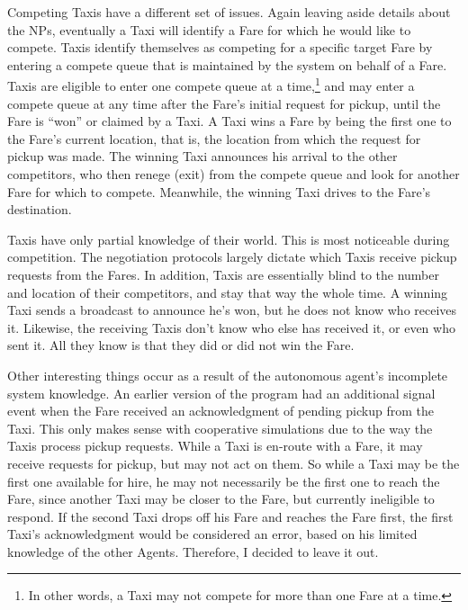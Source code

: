 \documentclass[11pt,letterpaper,onecolumn,twoside,openright,final]{report}
\begin{document}
Competing Taxis have a different set of issues.
Again leaving aside details about the NPs, eventually a Taxi will identify a Fare for which he would like to compete.
Taxis identify themselves as competing for a specific target Fare by entering a compete queue that is maintained by the system on behalf of a Fare.
Taxis are eligible to enter one compete queue at a time,\footnote{In other words, a Taxi may not compete for more than one Fare at a time.} and may enter a compete queue at any time after the Fare's initial request for pickup, until the Fare is ``won'' or claimed by a Taxi.
A Taxi wins a Fare by being the first one to the Fare's current location, that is, the location from which the request for pickup was made.
The winning Taxi announces his arrival to the other competitors, who then renege (exit) from the compete queue and look for another Fare for which to compete.
Meanwhile, the winning Taxi drives to the Fare's destination.

Taxis have only partial knowledge of their world.
This is most noticeable during competition.
The negotiation protocols largely dictate which Taxis receive pickup requests from the Fares.
In addition, Taxis are essentially blind to the number and location of their competitors, and stay that way the whole time.
A winning Taxi sends a broadcast to announce he's won, but he does not know who receives it.
Likewise, the receiving Taxis don't know who else has received it, or even who sent it.
All they know is that they did or did not win the Fare.

Other interesting things occur as a result of the autonomous agent's incomplete system knowledge.
An earlier version of the program had an additional signal event when the Fare received an acknowledgment of pending pickup from the Taxi.
This only makes sense with cooperative simulations due to the way the Taxis process pickup requests.
While a Taxi is en-route with a Fare, it may receive requests for pickup, but may not act on them.
So while a Taxi may be the first one available for hire, he may not necessarily be the first one to reach the Fare, since another Taxi may be closer to the Fare, but currently ineligible to respond.
If the second Taxi drops off his Fare and reaches the Fare first, the first Taxi's acknowledgment would be considered an error, based on his limited knowledge of the other Agents.
Therefore, I decided to leave it out.
\end{document}
